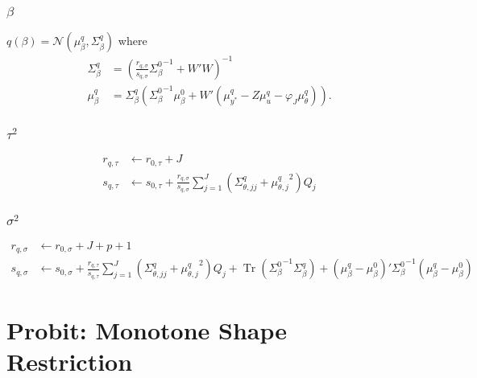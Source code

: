 \documentclass[11pt]{article}
\DeclareMathOperator{\Tr}{Tr}
\begin{document}
\subsubsection{$\beta$}
$q\left(\beta\right) = \mathcal{N}\left(\mu_{\beta}^{q}, \Sigma_{\beta}^{q}\right)$ where
\begin{align*}
  \Sigma_{\beta}^{q} &= \left(\frac{r_{q,\sigma}}{s_{q,\sigma}}{\Sigma_{\beta}^{0}}^{-1} + W'W\right)^{-1}\\
  \mu_{\beta}^{q} &= \Sigma_{\beta}^{q}\left({\Sigma_{\beta}^{0}}^{-1}\mu_{\beta}^{0}+W'\left(\mu_{y^{*}}^{q}-Z\mu_{u}^{q}-\varphi_{J}\mu_{\theta}^{q}\right)\right).
\end{align*}
\subsubsection{$\tau^{2}$}
\begin{align*}
  r_{q,\tau} &\leftarrow r_{0,\tau} +J\\
  s_{q,\tau} &\leftarrow s_{0,\tau} + \frac{r_{q,\sigma}}{s_{q,\sigma}}\sum_{j=1}^{J}\left(\Sigma_{\theta, jj}^{q}+{\mu_{\theta, j}^{q}}^{2}\right)Q_{j}
\end{align*}
\subsubsection{$\sigma^{2}$}
\begin{align*}
  r_{q,\sigma} &\leftarrow r_{0,\sigma} + J + p + 1\\
  s_{q,\sigma} &\leftarrow s_{0,\sigma} +\frac{r_{q,\tau}}{s_{q,\tau}}\sum_{j=1}^{J}\left(\Sigma_{\theta, jj}^{q}+{\mu_{\theta, j}^{q}}^{2}\right)Q_{j} + \Tr\left({\Sigma_{\beta}^{0}}^{-1}\Sigma_{\beta}^{q}\right) +\left(\mu_{\beta}^{q}-\mu_{\beta}^{0}\right)'{\Sigma_{\beta}^{0}}^{-1}\left(\mu_{\beta}^{q}-\mu_{\beta}^{0}\right)
\end{align*}
\section{Probit: Monotone Shape Restriction}
\end{document}
